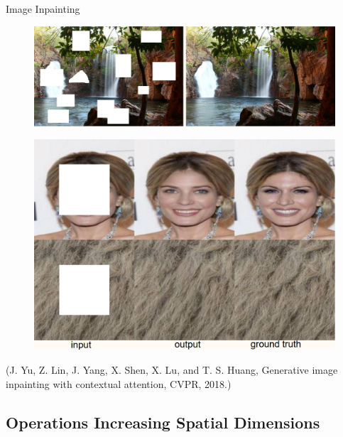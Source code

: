 \begin{frame}[allowframebreaks]

\begin{myexampleblock}{8.10}{Image Inpainting}
    \begin{figure}[H]
        \centering
        \includegraphics[width=1.0\textwidth]{.././assets/8.11.png}
    \end{figure}

    \begin{figure}[H]
        \centering
        \includegraphics[width=1.0\textwidth]{.././assets/8.12.png}
    \end{figure}

    (J. Yu, Z. Lin, J. Yang, X. Shen, X. Lu, and T. S. Huang, Generative image inpainting with contextual attention, CVPR, 2018.)
\end{myexampleblock}

\end{frame}

\subsection{Operations Increasing Spatial Dimensions}

